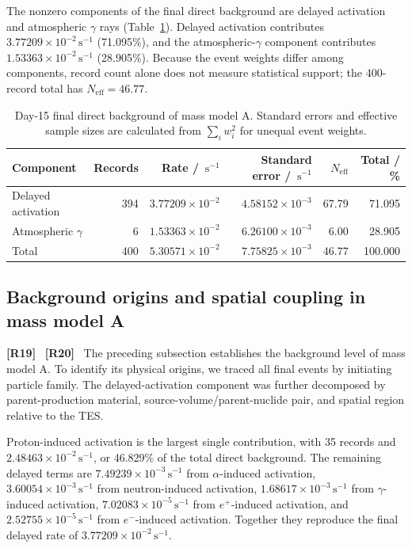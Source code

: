 \documentclass[11pt]{article}
\newcommand{\revmark}[1]{\textcolor{revisionblue}{\textbf{[R#1]}}\ }
\newcommand{\revblue}[1]{\textcolor{revisionblue}{#1}}
\newcommand{\cps}{\ensuremath{\,\mathrm{s^{-1}}}}
\begin{document}
The nonzero components of the final direct background are delayed activation
and \revblue{atmospheric $\gamma$ rays}
(Table~\ref{tab:reference_background_budget}). Delayed activation contributes
$3.77209\times10^{-2}\cps$ (71.095\%), and the \revblue{atmospheric-$\gamma$ component} contributes
$1.53363\times10^{-2}\cps$ (28.905\%). Because the event weights differ among
components, record count alone does not measure statistical support; the
400-record total has $N_{\mathrm{eff}}=46.77$.

\begin{table}[H]
\centering
\caption{Day-15 final direct background of mass model A. Standard errors and effective sample sizes are calculated from $\sum_i w_i^2$ for unequal event weights.}
\label{tab:reference_background_budget}
\footnotesize
\begin{tabular}{lrrrrr}
\toprule
Component & Records & Rate / $\cps$ & Standard error / $\cps$ & $N_{\mathrm{eff}}$ & Total / \% \\
\midrule
Delayed activation & 394 & $3.77209\times10^{-2}$ & $4.58152\times10^{-3}$ & 67.79 & 71.095 \\
\revblue{Atmospheric $\gamma$} & 6 & $1.53363\times10^{-2}$ & $6.26100\times10^{-3}$ & 6.00 & 28.905 \\
\midrule
Total & 400 & $5.30571\times10^{-2}$ & $7.75825\times10^{-3}$ & 46.77 & 100.000 \\
\bottomrule
\end{tabular}
\end{table}

\subsection{Background origins and spatial coupling in mass model A}
\label{subsec:mass_model_a_origins}

\revmark{19}
\revmark{20}
\begingroup
\color{revisionblue}
The preceding subsection establishes the background level of mass model A. To identify its physical origins, we traced all final events by initiating particle family. The delayed-activation component was further decomposed by parent-production material, source-volume/parent-nuclide pair, and spatial region relative to the TES.

Proton-induced activation is the largest single contribution, with 35 records and $2.48463\times10^{-2}\cps$, or 46.829\% of the total direct background. The remaining delayed terms are $7.49239\times10^{-3}\cps$ from $\alpha$-induced activation, $3.60054\times10^{-3}\cps$ from neutron-induced activation, $1.68617\times10^{-3}\cps$ from $\gamma$-induced activation, $7.02083\times10^{-5}\cps$ from $e^+$-induced activation, and $2.52755\times10^{-5}\cps$ from $e^-$-induced activation. Together they reproduce the final delayed rate of $3.77209\times10^{-2}\cps$.
\end{document}
